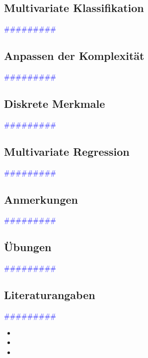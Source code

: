 \documentclass{article}
\begin{document}
  \subsection{Multivariate Klassifikation} %
      \textcolor{blue}{\#\#\#\#\#\#\#\#\#}
  \subsection{Anpassen der Komplexität} %
      \textcolor{blue}{\#\#\#\#\#\#\#\#\#}
  \subsection{Diskrete Merkmale} %
      \textcolor{blue}{\#\#\#\#\#\#\#\#\#}
  \subsection{Multivariate Regression} %
      \textcolor{blue}{\#\#\#\#\#\#\#\#\#}
  \subsection{Anmerkungen} %
      \textcolor{blue}{\#\#\#\#\#\#\#\#\#}
  \subsection{Übungen} %
      \textcolor{blue}{\#\#\#\#\#\#\#\#\#}
  \subsection{Literaturangaben} %
      \textcolor{blue}{\#\#\#\#\#\#\#\#\#}

      \begin{itemize}
      \color{red}
        \item
        \item
        \item
      \end{itemize}
\end{document}

